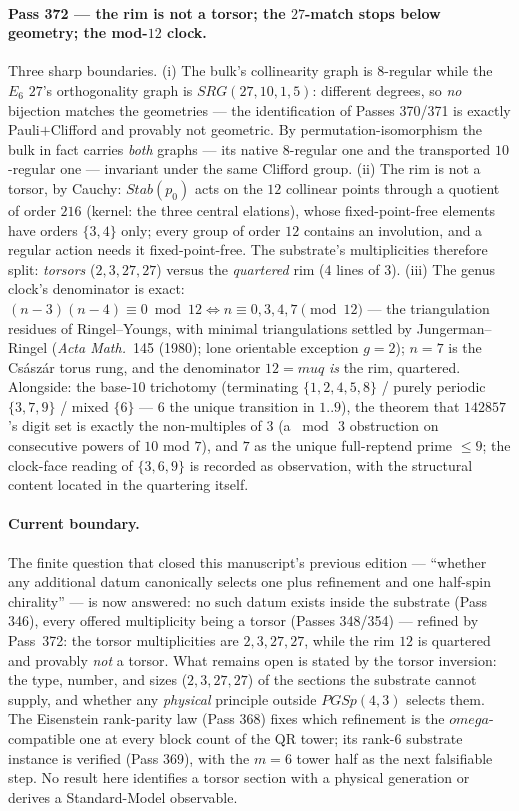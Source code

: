 \documentclass[12pt,a4paper]{article}
\def\mathrm#1{#1}%
\def\textbf#1{#1}%
\def\omega{omega}%
\def\mu{mu}%
\theoremstyle{definition}
\newcommand{\PGSp}{\mathrm{PGSp}}
\begin{document}
\paragraph{Pass 372 --- the rim is not a torsor; the $27$-match stops below
geometry; the mod-$12$ clock.}
Three sharp boundaries.  (i) The bulk's collinearity graph is $8$-regular
while the $E_6$ $27$'s orthogonality graph is $\mathrm{SRG}(27,10,1,5)$:
different degrees, so \emph{no} bijection matches the geometries --- the
identification of Passes 370/371 is exactly \textbf{Pauli$+$Clifford and
provably not geometric}.  By permutation-isomorphism the bulk in fact carries
\emph{both} graphs --- its native $8$-regular one and the transported
$10$-regular one --- invariant under the same Clifford group.  (ii) \textbf{The
rim is not a torsor}, by Cauchy: $\mathrm{Stab}(p_0)$ acts on the $12$
collinear points through a quotient of order $216$ (kernel: the three central
elations), whose fixed-point-free elements have orders $\{3,4\}$ only; every
group of order $12$ contains an involution, and a regular action needs it
fixed-point-free.  The substrate's multiplicities therefore split:
\emph{torsors} ($2,3,27,27$) versus the \emph{quartered} rim ($4$ lines of
$3$).  (iii) The genus clock's denominator is exact:
$(n{-}3)(n{-}4)\equiv0 \bmod 12 \iff n\equiv0,3,4,7 \pmod{12}$ --- the
triangulation residues of Ringel--Youngs, with minimal triangulations settled
by Jungerman--Ringel (\emph{Acta Math.}\ \textbf{145} (1980); lone orientable
exception $g=2$); $n=7$ is the Cs\'asz\'ar torus rung, and the denominator
$12=\mu q$ \emph{is} the rim, quartered.  Alongside: the base-$10$ trichotomy
(terminating $\{1,2,4,5,8\}$ / purely periodic $\{3,7,9\}$ / mixed $\{6\}$ ---
$6$ the unique transition in $1..9$), the theorem that $142857$'s digit set is
exactly the non-multiples of $3$ (a $\bmod\,3$ obstruction on consecutive
powers of $10$ mod $7$), and $7$ as the unique full-reptend prime $\le9$;
the clock-face reading of $\{3,6,9\}$ is recorded as observation, with the
structural content located in the quartering itself.

\paragraph{Current boundary.}
The finite question that closed this manuscript's previous edition ---
``whether any additional datum canonically selects one plus refinement and one
half-spin chirality'' --- is now answered: \textbf{no such datum exists inside
the substrate} (Pass 346), every offered multiplicity being a torsor
(Passes 348/354) --- refined by Pass~372: the torsor multiplicities are
$2,3,27,27$, while the rim $12$ is quartered and provably \emph{not} a torsor.  What remains open is stated by the torsor inversion: the
type, number, and sizes ($2,3,27,27$) of the sections the substrate cannot
supply, and whether any \emph{physical} principle outside $\PGSp(4,3)$ selects
them.  The Eisenstein rank-parity law (Pass 368) fixes which refinement is the
$\omega$-compatible one at every block count of the QR tower; its rank-$6$
substrate instance is verified (Pass 369), with the $m=6$ tower half as the
next falsifiable step.  No result here identifies a torsor section with a
physical generation or derives a Standard-Model observable.
\end{document}
